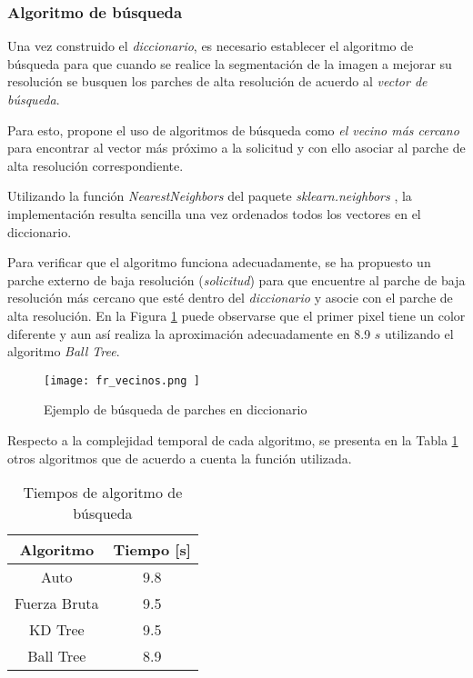 \subsubsection{Algoritmo de búsqueda}
\noindent
Una vez construido el \emph{diccionario}, es necesario establecer el algoritmo de 
búsqueda para que cuando se realice la segmentación de la imagen a mejorar 
su resolución se busquen los parches de alta resolución de acuerdo al 
\emph{vector de búsqueda}.

Para esto, \cite{freeman} propone el uso de algoritmos de búsqueda como 
\emph{el vecino más cercano} para encontrar al vector más próximo a la solicitud
y con ello asociar al parche de alta resolución correspondiente. 

Utilizando la función \emph{NearestNeighbors} del paquete \emph{sklearn.neighbors} \cite{scikit-learn},
la implementación resulta sencilla una vez ordenados todos los vectores en el 
diccionario. 

Para verificar que el algoritmo funciona adecuadamente, se ha propuesto un 
parche externo de baja resolución (\emph{solicitud}) para 
que encuentre al parche de baja resolución más cercano que esté dentro del
\emph{diccionario} y asocie con el parche de alta resolución. En la Figura
\ref{fig:fr_vecinos} puede observarse que el primer pixel tiene un color 
diferente y aun así realiza la aproximación adecuadamente en 8.9 $s$
utilizando el algoritmo \emph{Ball Tree}.  

\begin{figure}[H]
    \texttt{[image:  fr\_vecinos.png ]}
    \centering
    \caption{ Ejemplo de búsqueda de parches en diccionario}
    \label{fig:fr_vecinos}
\end{figure}

Respecto a la complejidad temporal de cada algoritmo, se presenta en 
la Tabla \ref{fig:fr_vecinos} otros algoritmos 
que de acuerdo a \cite{NN_search} cuenta la función utilizada.

\begin{table}[H]
    \caption{Tiempos de algoritmo de búsqueda}
    \label{tb:tiempos_snn}
    \centering
    \begin{tabular}{|c|c|}
    \hline
    \textbf{Algoritmo}    & \textbf{Tiempo} {[}s{]} \\ \hline
    Auto         & 9.8            \\ \hline
    Fuerza Bruta & 9.5            \\ \hline
    KD Tree      & 9.5            \\ \hline
    Ball Tree    & 8.9            \\ \hline
    \end{tabular}
\end{table}

